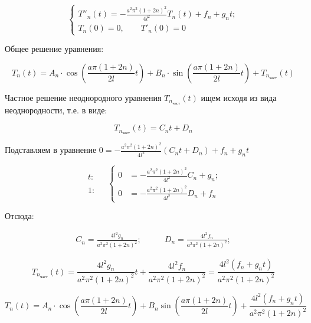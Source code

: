 $$
\begin{cases}
T''_{n}(t) = - \frac{a^{2}\pi^{2}(1 + 2n)^{2}}{4l^{2}}T_{n}(t) + f_{n} + g_{n}t; \\
T_{n}(0) = 0, \quad\quad T'_{n}(0) = 0
\end{cases}
$$

Общее решение уравнения:

$$T_{n}(t) = A_{n} \cdot \cos \left( \frac{a\pi (1 + 2n)}{2l}t \right) + B_{n} \cdot \sin \left( \frac{a\pi (1 + 2n)}{2l}t \right) + T_{n_{\text{част}}}(t)$$

Частное решение неоднородного уравнения $T_{n_{\text{част}}}(t)$ ищем исходя из вида неоднородности, т.е. в виде:

$$T_{n_{\text{част}}}(t) = C_{n}t + D_{n}$$

Подставляем в уравнение $0 = - \frac{a^{2}\pi^{2}(1 + 2n)^{2}}{4l^{2}} (C_{n}t + D_{n}) + f_{n} + g_{n}t$

\begin{equation*}
\begin{aligned}
t: \\
\\
1:
\end{aligned}
\quad \left\{
\begin{aligned}
       0 & = -\frac{a^{2}\pi^{2}(1 + 2n)^{2}}{4l^{2}} C_{n} + g_{n}; \\
       0 & = -\frac{a^{2}\pi^{2}(1 + 2n)^{2}}{4l^{2}} D_{n} + f_{n}
\end{aligned}
\right.
\end{equation*}

Отсюда:

\begin{equation*}
  \begin{split}
    C_{n} = \frac{4l^{2}g_{n}}{a^{2}\pi^{2}(1 + 2n)^{2}};
  \end{split}
\quad\quad
  \begin{split}
    D_{n} = \frac{4l^{2}f_{n}}{a^{2}\pi^{2}(1 + 2n)^{2}};
  \end{split}
\end{equation*}

$$T_{n_{\text{част}}}(t) = \frac{4l^{2}g_{n}}{a^{2}\pi^{2}(1 + 2n)^{2}}t + \frac{4l^{2}f_{n}}{a^{2}\pi^{2}(1 + 2n)^{2}} = \frac{4l^{2}(f_{n} + g_{n}t)}{a^{2}\pi^{2}(1 + 2n)^{2}} $$

$$T_{n}(t) = A_{n}\cdot \cos\left( \frac{a\pi(1 + 2n)}{2l}t \right) + B_{n} \sin \left( \frac{a\pi(1 + 2n)}{2l}t \right) + \frac{4l^{2}(f_{n} + g_{n}t)}{a^{2}\pi^{2}(1 + 2n)^{2}}$$

